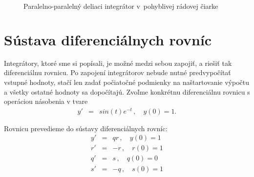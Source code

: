 \begin{figure}[h]
\centering
{}
\caption{Paralelno-paralelný deliaci integrátor v~pohyblivej rádovej čiarke}
\label{ppdi_fp}
\end{figure}
\bigskip

\newpage
\section{Sústava diferenciálnych rovníc} \label{navrhSustava}
Integrátory, ktoré sme si popísali, je možné medzi sebou zapojiť, a riešiť tak diferenciálnu rovnicu. Po zapojení integrátorov nebude nutné predvypočítať vstupné hodnoty, stačí len zadať počiatočné podmienky na naštartovanie výpočtu a všetky ostatné hodnoty sa dopočítajú.
Zvoľme konkrétnu diferenciálnu rovnicu s operáciou násobenia v tvare
\begin{eqnarray}
y' & = & sin(t) e^{-t} \, , \quad y(0) = 1 . \label{dif_sint_et}
\end{eqnarray}
\bigskip

Rovnicu prevedieme do sústavy diferenciálnych rovníc:
\begin{eqnarray}
y' & = & qr \, , \quad y(0) = 1 \nonumber \\
r' & = & -r \, , \quad r(0) = 1 \nonumber \\
q' & = & s \, , \quad q(0) = 0 \nonumber \\
s' & = & -q \, , \quad s(0) = 1 \nonumber \\
\end{eqnarray}


